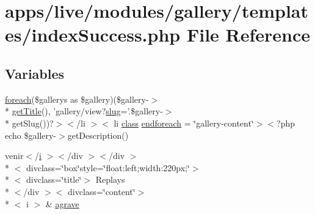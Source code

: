 \hypertarget{live_2modules_2gallery_2templates_2index_success_8php}{\section{apps/live/modules/gallery/templates/index\-Success.php File Reference}
\label{live_2modules_2gallery_2templates_2index_success_8php}
}
\subsection*{Variables}
\begin{DoxyCompactItemize}
\item 
\hyperlink{presse_2modules_2news_2templates_2index_success_8php_abc56db52b2e9a59bcd5c9e45ac5cb332}{foreach}(\$gallerys as \$gallery)(\$gallery-\/$>$\\*
\hyperlink{backend_2modules_2block_2templates_2index_success_8php_a58abfb4a1e6c312e255e475413e1d76d}{get\-Title}(), 'gallery/view?\hyperlink{backend_2modules_2ipn_2templates_2view_success_8php_a2b7d6694be020169de3a660b1b93a40d}{slug}='.\$gallery-\/$>$\\*
get\-Slug())?$>$$<$/li $>$$<$ li \hyperlink{live_2modules_2news_2templates_2__actualitelight_8php_a185c73c6507391d1eb38c776b68ce96d}{class} \hyperlink{live_2modules_2gallery_2templates_2index_success_8php_a1564a48b746a96e888ba07e118a7002c}{endforeach} = \char`\"{}gallery-\/content\char`\"{}$>$$<$?php echo \$gallery-\/$>$get\-Description()
\item 
venir$<$/\hyperlink{live_2modules_2partner_2templates_2__rolling_8php_a7e98b8a17c0aad30ba64d47b74e2a6c1}{i} $>$$<$/div $>$$<$/div $>$\\*
$<$ divclass=\char`\"{}box\char`\"{}style=\char`\"{}float\-:left;width\-:220px;\char`\"{}$>$\\*
$<$ divclass=\char`\"{}title\char`\"{}$>$ Replays\\*
$<$/div $>$$<$ divclass=\char`\"{}content\char`\"{}$>$\\*
$<$ i $>$ \& \hyperlink{live_2modules_2gallery_2templates_2index_success_8php_a184a65fae2dd681d3cfaff490e159465}{agrave}
\end{DoxyCompactItemize}


